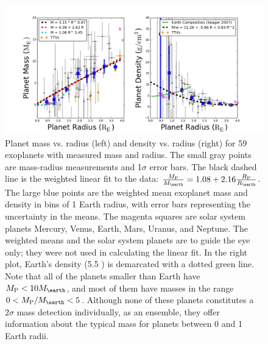 \documentclass[11pt]{aastex}
\begin{document}
\begin{figure}[htbp] %
   \centering
    \includegraphics[width=6in]{mr_small.png} 
   \caption{\small Planet mass vs. radius (left) and density vs. radius (right) for 59 exoplanets with measured mass and radius.  The small gray points are mass-radius measurements and 1$\sigma$ error bars.  The black dashed line is the weighted linear fit to the data: $\frac{\mpl}{\mearth} = 1.08 + 2.16 \frac{\rpl}{\rearth}$.  The large blue points are the weighted mean exoplanet mass and density in bins of 1 Earth radius, with error bars representing the uncertainty in the means.  The magenta squares are solar system planets Mercury, Venus, Earth, Mars, Uranus, and Neptune. The weighted means and the solar system planets are to guide the eye only; they were not used in calculating the linear fit.  In the right plot, Earth's density (5.5 \gcc) is demarcated with a dotted green line.  Note that all of the planets smaller than Earth have $\mpl < 10 \mearth$, and most of them have masses in the range $0 < \mpl/\mearth < 5$.  Although none of these planets constitutes a $2\sigma$ mass detection individually, as an ensemble, they offer information about the typical mass for planets between 0 and 1 Earth radii.}
   \label{fig:rm_4}
\end{figure}
\end{document}
